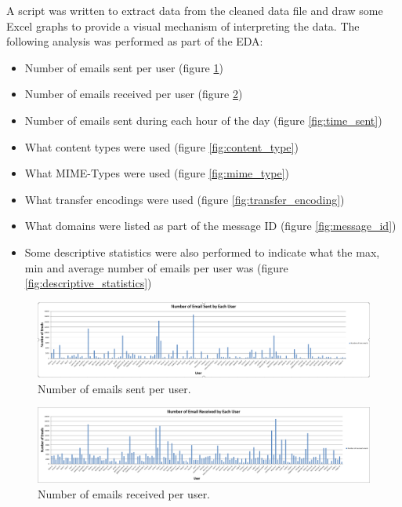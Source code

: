\documentclass[hidelinks,english]{article}
\begin{document}
		A script was written to extract data from the cleaned data file and draw some Excel graphs to provide a visual mechanism of interpreting the data. The following analysis was performed as part of the EDA:
		\begin{itemize}
			\item Number of emails sent per user (figure \ref{fig:emails_sent})
			\item Number of emails received per user (figure \ref{fig:emails_received})
			\item Number of emails sent during each hour of the day (figure \ref{fig:time_sent})
			\item What content types were used (figure \ref{fig:content_type})
			\item What MIME-Types were used (figure \ref{fig:mime_type})
			\item What transfer encodings were used (figure \ref{fig:transfer_encoding})
			\item What domains were listed as part of the message ID (figure \ref{fig:message_id})
			\item Some descriptive statistics were also performed to indicate what the max, min and average number of emails per user was (figure \ref{fig:descriptive_statistics})
		\end{itemize}
		
		\begin{figure}[h]
			\centering
			\includegraphics[width=\textwidth]{emails_sent.png}
			\caption{Number of emails sent per user.}
			\label{fig:emails_sent}
		\end{figure}
		
		\begin{figure}[h]
			\centering
			\includegraphics[width=\textwidth]{emails_received.png}
			\caption{Number of emails received per user.}
			\label{fig:emails_received}
		\end{figure}
		
\end{document}
